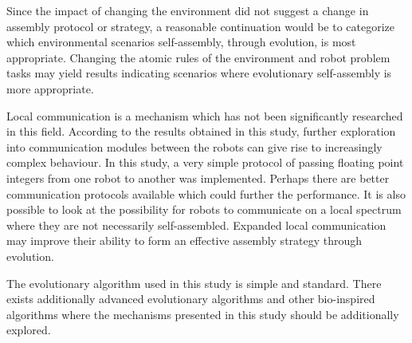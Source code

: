 Since the impact of changing the environment did not suggest a change in assembly protocol or strategy, a reasonable continuation would be to categorize which environmental scenarios self-assembly, through evolution, is most appropriate. 
Changing the atomic rules of the environment and robot problem tasks may yield results indicating scenarios where evolutionary self-assembly is more appropriate.

Local communication is a mechanism which has not been significantly researched in this field. 
According to the results obtained in this study, further exploration into communication modules between the robots can give rise to increasingly complex behaviour.
In this study, a very simple protocol of passing floating point integers from one robot to another was implemented.
Perhaps there are better communication protocols available which could further the performance.
It is also possible to look at the possibility for robots to communicate on a local spectrum where they are not necessarily self-assembled.
Expanded local communication may improve their ability to form an effective assembly strategy through evolution.

The evolutionary algorithm used in this study is simple and standard.
There exists additionally advanced evolutionary algorithms and other bio-inspired algorithms where the mechanisms presented in this study should be additionally explored.